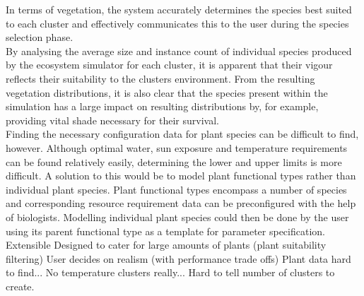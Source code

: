 In terms of vegetation, the system accurately determines the species best suited to each cluster and effectively communicates this to the user during the species selection phase.\\
By analysing the average size and instance count of individual species produced by the ecosystem simulator for each cluster, it is apparent that their vigour reflects their suitability to the clusters environment. From the resulting vegetation distributions, it is also clear that the species present within the simulation has a large impact on resulting distributions by, for example, providing vital shade necessary for their survival.\\
Finding the necessary configuration data for plant species can be difficult to find, however. Although optimal water, sun exposure and temperature requirements can be found relatively easily, determining the lower and upper limits is more difficult. A solution to this would be to model plant functional types rather than individual plant species. Plant functional types encompass a number of species and corresponding resource requirement data can be preconfigured with the help of biologists. Modelling individual plant species could then be done by the user using its parent functional type as a template for parameter specification.\\


Extensible Designed to cater for large amounts of plants (plant suitability filtering)
User decides on realism (with performance trade offs)
Plant data hard to find...
No temperature clusters really...
Hard to tell number of clusters to create.